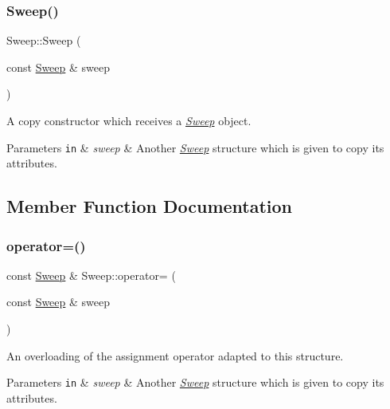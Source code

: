 \subsubsection{\texorpdfstring{Sweep()}{Sweep()}\hspace{0.1cm}{\footnotesize\ttfamily [2/2]}}
{\footnotesize\ttfamily Sweep\+::\+Sweep (\begin{DoxyParamCaption}\item[{const \hyperlink{structSweep}{Sweep} \&}]{sweep }\end{DoxyParamCaption})\hspace{0.3cm}{\ttfamily [inline]}}



A copy constructor which receives a {\itshape \hyperlink{structSweep}{Sweep}} object. 


\begin{DoxyParams}[1]{Parameters}
\mbox{\tt in}  & {\em sweep} & Another {\itshape \hyperlink{structSweep}{Sweep}} structure which is given to copy its attributes. \\
\hline
\end{DoxyParams}


\subsection{Member Function Documentation}
\mbox{\label{structSweep_a0cd5bc95e0e71b06887de9de4ea5ee6a}} 
\subsubsection{\texorpdfstring{operator=()}{operator=()}}
{\footnotesize\ttfamily const \hyperlink{structSweep}{Sweep} \& Sweep\+::operator= (\begin{DoxyParamCaption}\item[{const \hyperlink{structSweep}{Sweep} \&}]{sweep }\end{DoxyParamCaption})}



An overloading of the assignment operator adapted to this structure. 


\begin{DoxyParams}[1]{Parameters}
\mbox{\tt in}  & {\em sweep} & Another {\itshape \hyperlink{structSweep}{Sweep}} structure which is given to copy its attributes. \\
\hline
\end{DoxyParams}


